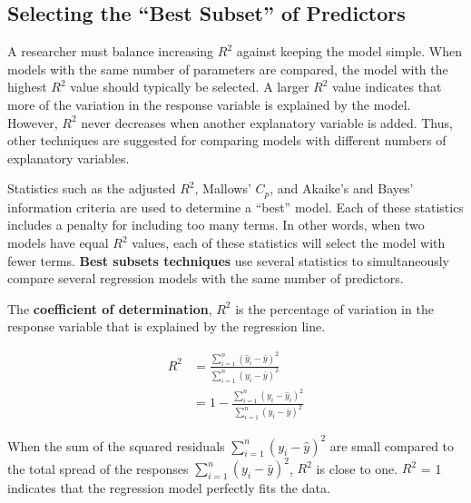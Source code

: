 \documentclass[
]{report}
\begin{document}
\hypertarget{selecting-the-best-subset-of-predictors}{%
\subsection*{Selecting the ``Best Subset'' of Predictors}\label{selecting-the-best-subset-of-predictors}}

A researcher must balance increasing \(\scriptstyle {R}^2\) against keeping the model simple. When models with the same number of parameters are compared, the model with the highest \(\scriptstyle {R}^2\) value should typically be selected. A larger \(\scriptstyle {R}^2\) value indicates that more of the variation in the response variable is explained by the model. However, \(\scriptstyle {R}^2\) never decreases when another explanatory variable is added. Thus, other techniques are suggested for comparing models with different numbers of explanatory variables.

Statistics such as the adjusted \(\scriptstyle {R}^2\), Mallows' \(\scriptstyle C_p\), and Akaike's and Bayes' information criteria are used to determine a ``best'' model. Each of these statistics includes a penalty for including too many terms. In other words, when two models have equal \(\scriptstyle {R}^2\) values, each of these statistics will select the model with fewer terms. \textbf{Best subsets techniques} use several statistics to simultaneously compare several regression models with the same number of predictors.

The \textbf{coefficient of determination}, \textbf{\(\scriptstyle {R}^2\)} is the percentage of variation in the response variable that is explained by the regression line.

\begin{equation}
\label{R2}
\begin{split}
R^2 &= \frac{\sum_{i=1}^{n}(\hat{y}_i - \bar{y})^2}{\sum_{i=1}^{n}({y}_i - \bar{y})^2} \\
    &= 1 - \frac{\sum_{i=1}^{n}({y}_i - \hat{y}_i)^2}{\sum_{i=1}^{n}({y}_i - \bar{y})^2}
\end{split}
\tag{3.2}
\end{equation}

When the sum of the squared residuals \(\scriptstyle {\sum_{i=1}^{n}({y}_i - \hat{y})^2}\) are small compared to the total spread of the responses \(\scriptstyle {\sum_{i=1}^{n}({y}_i - \bar{y})^2}\), \(\scriptstyle {R}^2\) is close to one. \(\scriptstyle {R}^2\) = 1 indicates that the regression model perfectly fits the data.
\end{document}
